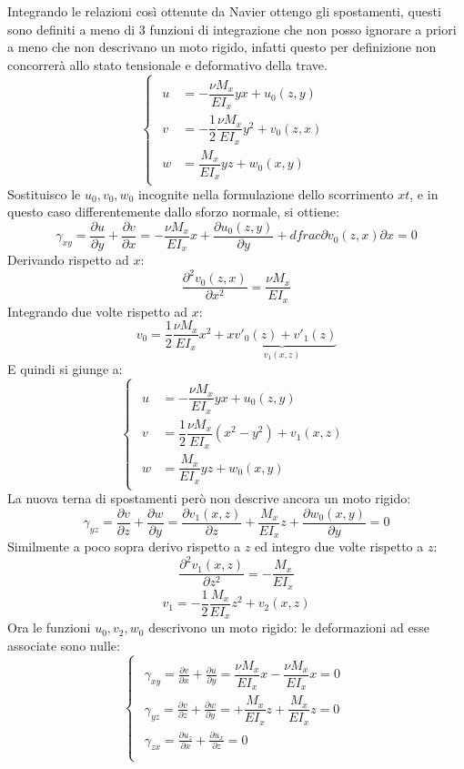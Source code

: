 \documentclass{article}
\begin{document}
\begin{adjustwidth}{2in}{}
		Integrando le relazioni così ottenute da Navier ottengo gli spostamenti, questi sono definiti a meno di 3 funzioni di integrazione che non posso ignorare a priori a meno che non descrivano un moto rigido, infatti questo per definizione non concorrerà allo stato tensionale e deformativo della trave.
		\[ \begin{cases}
			\begin{aligned}
				u & = -\dfrac{\nu M_x}{EI_x}yx + u_0(z,y) \\
				v & = -\dfrac{1}{2}\dfrac{\nu M_x}{EI_x}y^2 + v_0(z,x) \\
				w & = \dfrac{M_x}{EI_x}yz + w_0(x,y)
			\end{aligned}
		\end{cases} \]
		Sostituisco le $ u_0,  v_0,  w_0$ incognite nella formulazione dello scorrimento $xt$, e in questo caso differentemente dallo sforzo normale, si ottiene:
		\[ 	\gamma_{xy} =   \frac{\partial u}{\partial y} + \dfrac{\partial v}{\partial x} = -\dfrac{\nu M_x}{EI_x}x + \dfrac{\partial u_0(z,y)}{\partial y} + dfrac{\partial v_0(z,x)}{\partial x} = 0\] 
		Derivando rispetto ad $x$:
		\[  \dfrac{\partial^2 v_0(z,x)}{\partial x^2} = \dfrac{\nu M_x}{EI_x}  \]
		Integrando due volte rispetto ad $x$:
		\[  v_0 = \dfrac{1}{2}\dfrac{\nu M_x}{EI_x}x^2 + \underbrace{xv'_0(z) + v'_1(z)}_\text{$v_1(x,z)$} \]
		E quindi si giunge a: 
		\[ \begin{cases}
			\begin{aligned}
				u & = -\dfrac{\nu M_x}{EI_x}yx + u_0(z,y) \\
				v & = \dfrac{1}{2}\dfrac{\nu M_x}{EI_x}(x^2 - y^2) + v_1(x,z) \\
				w & = \dfrac{M_x}{EI_x}yz + w_0(x,y)
			\end{aligned}
		\end{cases} \]
		La nuova terna di spostamenti però non descrive ancora un moto rigido:
		\[\gamma_{yz} =   \frac{\partial v}{\partial z} + \frac{\partial w}{\partial y} = \dfrac{\partial v_1(x,z)}{\partial z} + \dfrac{M_x}{EI_x}z +\dfrac{\partial w_0(x,y)}{\partial y} = 0\]
		Similmente a poco sopra derivo rispetto a $z$ ed integro due volte rispetto a $z$: 
		\[  \dfrac{\partial^2 v_1(x,z)}{\partial z^2} = - \dfrac{M_x}{EI_x}  \]
		\[  v_1 = -\dfrac{1}{2}\dfrac{M_x}{EI_x}z^2 + v_2(x,z) \]
		Ora le funzioni $ u_0,  v_2,  w_0$ descrivono un moto rigido: le deformazioni ad esse associate sono nulle:
		\[\begin{cases}
			\begin{aligned}
				\gamma_{xy} =   \frac{\partial v}{\partial x} + \frac{\partial u}{\partial y} = \dfrac{\nu M_x}{EI_x}x - \dfrac{\nu M_x}{EI_x}x  = 0\\
				\gamma_{yz} =   \frac{\partial v}{\partial z} + \frac{\partial w}{\partial y} = + \dfrac{M_x}{EI_x}z + \dfrac{M_x}{EI_x}z = 0 \\
				\gamma_{zx} =   \frac{\partial u_z}{\partial x} + \frac{\partial u_x}{\partial z} = 0 \\
			\end{aligned}\end{cases}\]
		

\end{adjustwidth}
\end{document}
